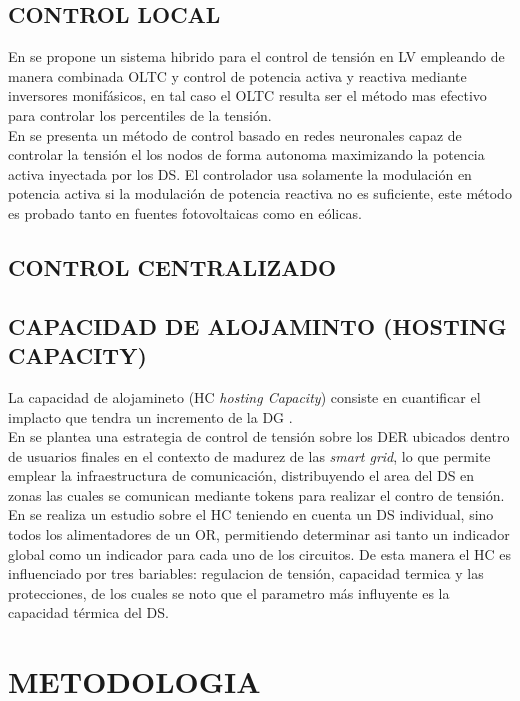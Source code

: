 \documentclass[12pt, letterpaper]{report}
\begin{document}
\section{CONTROL LOCAL}
En \cite{Efkarpidis2016} se propone un sistema hibrido para el control de tensión en LV empleando de manera combinada OLTC y control de potencia activa y reactiva mediante inversores monifásicos, en tal caso el OLTC resulta ser el método mas efectivo para controlar los percentiles de la tensión.\\ En \cite{Calderaro2014} se presenta un método de control basado en redes neuronales  capaz de controlar la tensión el los nodos de forma autonoma maximizando la potencia activa inyectada por los DS. El controlador usa solamente la modulación en potencia activa si la modulación  de potencia reactiva no es suficiente, este método es probado tanto en fuentes fotovoltaicas  como en eólicas.\\  
\section{CONTROL CENTRALIZADO}
\section{CAPACIDAD DE ALOJAMINTO (HOSTING CAPACITY)}	
La capacidad de alojamineto (HC \textit{hosting Capacity}) consiste en cuantificar el implacto que tendra un incremento de la DG \cite{Bollen2008}.\\
En \cite{Caldon2015a} se plantea una estrategia de control de tensión sobre los DER ubicados dentro  de usuarios finales en el contexto de madurez de las \textit{smart grid}, lo que permite emplear la infraestructura de comunicación, distribuyendo el area del DS en zonas las cuales se comunican mediante tokens para realizar el contro de tensión.\\
En \cite{Rylander2016a} se realiza un estudio sobre el HC teniendo en cuenta un DS individual,  sino todos los alimentadores de un OR, permitiendo determinar  asi tanto un indicador global como un indicador para cada uno de los circuitos.  De esta manera el HC es influenciado por tres bariables: regulacion de tensión, capacidad termica  y las protecciones, de los cuales se noto que el parametro más influyente es la capacidad térmica del DS.

\chapter{METODOLOGIA}
\end{document}

